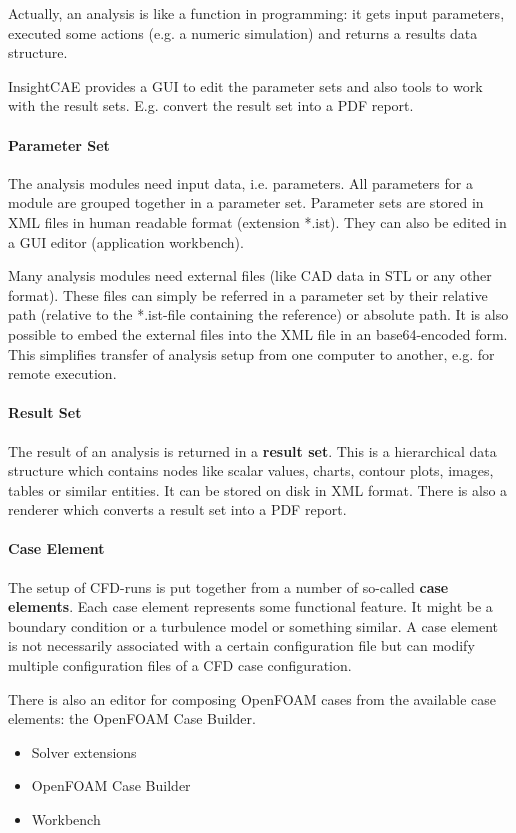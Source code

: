 Actually, an analysis is like a function in programming: it gets input parameters, executed some actions (e.g. a numeric simulation) and returns a results data structure.

InsightCAE provides a GUI to edit the parameter sets and also tools to work with the result sets. E.g. convert the result set into a PDF report.

\paragraph{Parameter Set}

The analysis modules need input data, i.e. parameters. All parameters for a module are grouped together in a parameter set. Parameter sets are stored in XML files in human readable format (extension *.ist). They can also be edited in a GUI editor (application workbench).

Many analysis modules need external files (like CAD data in STL or any other format). These files can simply be referred in a parameter set by their relative path (relative to the *.ist-file containing the reference) or absolute path. It is also possible to embed the external files into the XML file in an base64-encoded form. This simplifies transfer of analysis setup from one computer to another, e.g. for remote execution.

\paragraph{Result Set}

The result of an analysis is returned in a \textbf{result set}. This is a hierarchical data structure which contains nodes like scalar values, charts, contour plots, images, tables or similar entities.
It can be stored on disk in XML format.
There is also a renderer which converts a result set into a PDF report.

\paragraph{Case Element}

The setup of CFD-runs is put together from a number of so-called \textbf{case elements}. Each case element represents some functional feature. It might be a boundary condition or a turbulence model or something similar. A case element is not necessarily associated with a certain configuration file but can modify multiple configuration files of a CFD case configuration.

There is also an editor for composing OpenFOAM cases from the available case elements: the OpenFOAM Case Builder.


\begin{itemize}
\item Solver extensions
\item OpenFOAM Case Builder
\item Workbench
\end{itemize}



